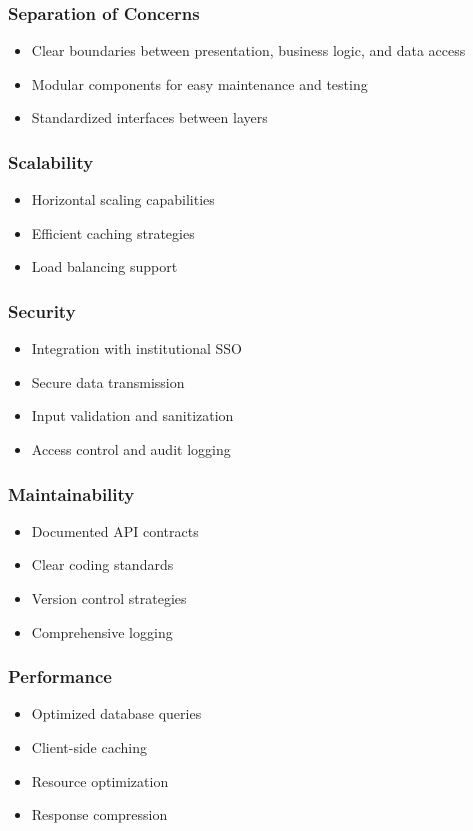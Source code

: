 \documentclass[a4paper]{report}
\begin{document}
\subsubsection{Separation of Concerns}
\begin{itemize}
    \item Clear boundaries between presentation, business logic, and data access
    \item Modular components for easy maintenance and testing
    \item Standardized interfaces between layers
\end{itemize}

\begin{multicols}{2}
\subsubsection{Scalability}
\begin{itemize}
    \item Horizontal scaling capabilities
    \item Efficient caching strategies
    \item Load balancing support
\end{itemize}

\subsubsection{Security}
\begin{itemize}
    \item Integration with institutional SSO
    \item Secure data transmission
    \item Input validation and sanitization
    \item Access control and audit logging
\end{itemize}

\subsubsection{Maintainability}
\begin{itemize}
    \item Documented API contracts
    \item Clear coding standards
    \item Version control strategies
    \item Comprehensive logging
\end{itemize}

\subsubsection{Performance}
\begin{itemize}
    \item Optimized database queries
    \item Client-side caching
    \item Resource optimization
    \item Response compression
\end{itemize}
\end{multicols}
\end{document}

